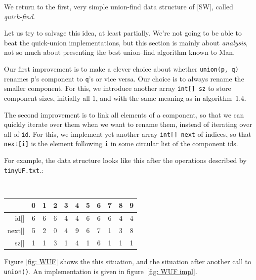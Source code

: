 \documentclass{tstextbook}
\begin{document}
We return to the first, very simple union-find data structure of [SW],
called \emph{quick-find}. 

Let us try to salvage this idea, at least partially. We're not going
to be able to beat the quick-union implementations, but this section
is mainly about \emph{analysis}, not so much about presenting the best
union--find algorithm known to Man.

Our first improvement is to make a clever choice about whether
\texttt{union(p, q)} renames {\tt p}'s component to {\tt q}'s or vice
versa. 
Our choice is to always rename the smaller component.
For this, we introduce another array {\tt int[] sz} to store component sizes, initially all $1$, and with the same meaning as in algorithm~1.4.

The second improvement is to link all elements of a component, so that we can quickly iterate over them when we want to rename them, instead of iterating over all of {\tt id}.
For this, we implement yet another array {\tt int[] next} of indices,
so that {\tt next[i]} is the element following {\tt i} in some
circular list of the component ids.

For example, the data structure looks like this after the operations
described by {\tt tinyUF.txt}.:

\medskip
{\tt \small
  \begin{tabular}{rcccccccccc}
      & 0 & 1 & 2 & 3 & 4 & 5 & 6 & 7 & 8 & 9 \\\midrule
id[] & 6 &6 &6 &4 &4 &6 &6 &6 &4 &4 \\
next[] & 5 &2 &0 &4 &9 &6 &7 &1 &3 &8 \\
sz[] &1 &1 &3 &1 &4 &1 &6 &1 &1 &1 
  \end{tabular}}
\medskip

Figure \ref{fig: WUF} shows the this situation, and the situation
after another call to {\tt union()}. 
An implementation is given in figure~\ref{fig: WUF impl}.
\end{document}
